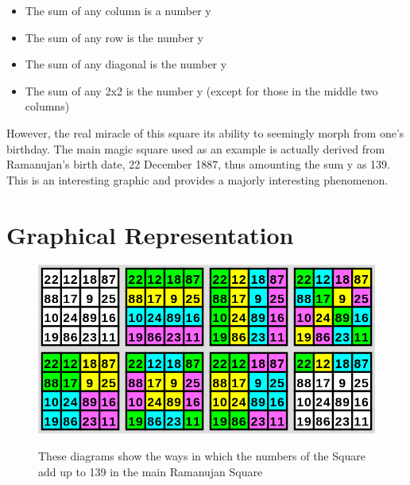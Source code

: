 \documentclass[a4paper,12pt,oneside]{book}
\begin{document}
\begin{itemize}
  \item The sum of any column is a number y
  \item The sum of any row is the number y
  \item The sum of any diagonal is the number y
  \item The sum of any 2x2 is the number y (except for those in the middle two columns)
\end{itemize}

However, the real miracle of this square its ability to seemingly morph from one's birthday. The main magic square used as an example is actually derived from Ramanujan's birth date, 22 December 1887, thus amounting the sum y as 139. This is an interesting graphic and provides a majorly interesting phenomenon.

\section{Graphical Representation}
\begin{figure}[H]
\begin{center}
\includegraphics[scale = 0.4]{MagicSquare} 
\cite{magicSquare}
\caption{These diagrams show the ways in which the numbers of the Square add up to 139 in the main Ramanujan Square}
\end{center}
\end{figure}

\newpage
\end{document}

